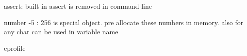\documentclass[12pt,a4paper]{article}
\begin{document}
assert: built-in assert is removed in command line 

number -5 : 256 is special object. pre allocate these numbers in memory. also for any char can be used in variable name

cprofile
\end{document}
